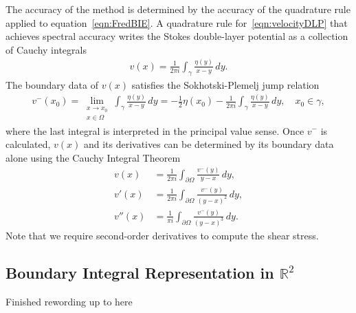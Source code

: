 \documentclass[3p]{elsarticle}
\newcommand{\vsp}[1]{\vspace{#1 pc} \noindent}
\newcommand{\nick}[1]{ {\color{red} #1} }
\newcommand{\bd}{{\partial}}
\newcommand{\RR}{{\mathbb{R}}}
\begin{document}
The accuracy of the method is determined by the accuracy of the
quadrature rule applied to equation~\eqref{eqn:FredBIE}. A quadrature
rule for~\eqref{eqn:velocityDLP} that achieves spectral accuracy writes
the Stokes double-layer potential as a collection of Cauchy integrals
\begin{align}
  v(x) = \frac{1}{2\pi i} \int_{\gamma} \frac{\eta(y)}{x-y} \, dy.
\end{align}
The boundary data of $v(x)$ satisfies the Sokhotski-Plemelj jump relation
\begin{align}
  v^{-}(x_0) = \lim_{\substack{x \rightarrow x_0 \\ x \in \Omega}} \int_{\gamma}
    \frac{\eta(y)}{x-y}\, dy = -\frac{1}{2}\eta(x_0) - 
    \frac{1}{2\pi i} \int_{\gamma} \frac{\eta(y)}{x-y} \, dy,
    \quad x_0 \in \gamma,
    \label{eqn:SP}
\end{align}
where the last integral is interpreted in the principal value sense.
Once $v^{-}$ is calculated, $v(x)$ and its derivatives can be determined
by its boundary data alone using the Cauchy Integral Theorem
\begin{subequations}
  \label{eqn:cauchy}
  \begin{alignat}{3}
  v(x) &= \frac{1}{2\pi i}\int_{\bd\Omega} 
    \frac{v^{-}(y)}{y-x} \,dy, \\
  v'(x) &= \frac{1}{2\pi i} \int_{\bd\Omega}
    \frac{v^{-}(y)}{(y-x)^2} \, dy, \\
  v''(x) &= \frac{1}{\pi i} \int_{\bd\Omega}
    \frac{v^{-}(y)}{(y-x)^3} \, dy.
  \end{alignat}
\end{subequations}
Note that we require second-order derivatives to compute the shear
stress.



\subsection{Boundary Integral Representation in $\RR^2$}

\vsp{2} \nick{Finished rewording up to here} \vsp{2}
\end{document}

